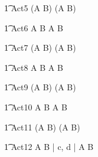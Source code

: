 \begin{circusaction}
        \t1 Act5 \circdef (A \circtimeout {} \rcirctime B) \extchoice (A \circtimeout {} \rcirctime B) \\
\end{circusaction}

\begin{circusaction}
	\t1 Act6 \circdef A \circtimeout {} \rcirctime B \intchoice A \circtimeout {} \rcirctime B \\
\end{circusaction}

\begin{circusaction}
        \t1 Act7 \circdef (A \circtimeout {} \rcirctime B) \intchoice (A \circtimeout {} \rcirctime B) \\
\end{circusaction}

\begin{circusaction}
	\t1 Act8 \circdef A \circtimeout {} \rcirctime B \interleave A \circtimeout {} \rcirctime B \\
\end{circusaction}

\begin{circusaction}
        \t1 Act9 \circdef (A \circtimeout {} \rcirctime B) \interleave (A \circtimeout {} \rcirctime B) \\
\end{circusaction}

\begin{circusaction}
        \t1 Act10 \circdef A \circtimeout {} \rcirctime B \circinterrupt  A \circtimeout {} \rcirctime B \\
\end{circusaction}

\begin{circusaction}
        \t1 Act11 \circdef (A \circtimeout {} \rcirctime B) \circinterrupt (A \circtimeout {} \rcirctime B) \\
\end{circusaction}


\begin{circusaction}
        \t1 Act12 \circdef A \circtimeout {} \rcirctime B \lpar | \lchanset c, d \rchanset | \rpar  A \circtimeout {} \rcirctime B \\
\end{circusaction}

